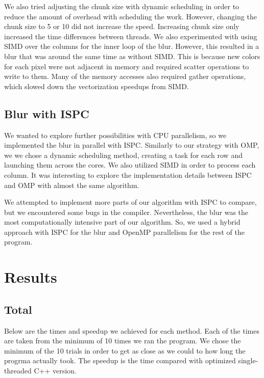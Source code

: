 \documentclass[12pt]{article}
\begin{document}
We also tried adjusting the chunk size with dynamic scheduling in order to
reduce the amount of overhead with scheduling the work. However, changing the
chunk size to 5 or 10 did not increase the speed. Increasing chunk size only
increased the time differences between threads. We also experimented with using
SIMD over the columns for the inner loop of the blur. However, this resulted in
a blur that was around the same time as without SIMD. This is because new
colors for each pixel were not adjacent in memory and required scatter
operations to write to them. Many of the memory accesses also required gather
operations, which slowed down the vectorization speedups from SIMD.

\subsection{Blur with ISPC}
We wanted to explore further possibilities with CPU parallelism, so we
implemented the blur in parallel with ISPC. Similarly to our strategy with OMP,
we we chose a dynamic scheduling method, creating a task for each row and
launching them across the cores. We also utilized SIMD in order to process each
column. It was interesting to explore the implementation details between ISPC
and OMP with almost the same algorithm.

We attempted to implement more parts of our algorithm with ISPC to compare, but
we encountered some bugs in the compiler. Nevertheless, the blur was the
most computationally intensive part of our algorithm. So, we used a hybrid
approach with ISPC for the blur and OpenMP parallelism for the rest of the
program.

\section{Results}

\subsection{Total}
Below are the times and speedup we achieved for each method. Each of the times
are taken from the minimum of 10 times we ran the program. We chose the
minimum of the 10 trials in order to get as close as we could to how long
the progrma actually took. The speedup is the time compared with optimized
single-threaded C++ version.\\
\end{document}
